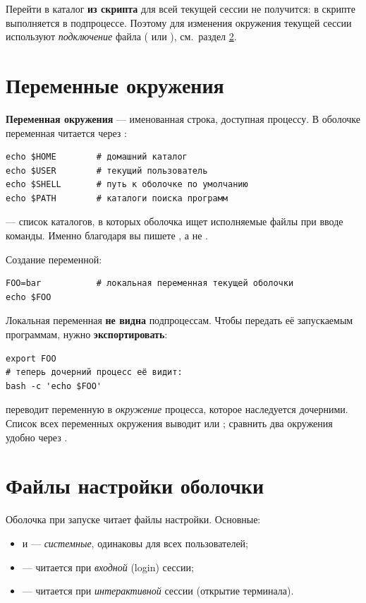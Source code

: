 \begin{tipbox}
Перейти в каталог \textbf{из скрипта} для всей текущей сессии
не получится:  в скрипте выполняется в подпроцессе.
Поэтому для изменения окружения текущей сессии используют
\emph{подключение} файла ( или ),
см.\ раздел \ref{sec:bashrc}.
\end{tipbox}

\section{Переменные окружения}

\textbf{Переменная окружения} --- именованная строка, доступная
процессу. В оболочке переменная читается через :
\begin{verbatim}
echo $HOME        # домашний каталог
echo $USER        # текущий пользователь
echo $SHELL       # путь к оболочке по умолчанию
echo $PATH        # каталоги поиска программ
\end{verbatim}

 --- список каталогов, в которых оболочка ищет исполняемые
файлы при вводе команды. Именно благодаря  вы пишете
, а не .

Создание переменной:
\begin{verbatim}
FOO=bar           # локальная переменная текущей оболочки
echo $FOO
\end{verbatim}

Локальная переменная \textbf{не видна} подпроцессам. Чтобы передать
её запускаемым программам, нужно \textbf{экспортировать}:
\begin{verbatim}
export FOO
# теперь дочерний процесс её видит:
bash -c 'echo $FOO'
\end{verbatim}

 переводит переменную в \emph{окружение} процесса,
которое наследуется дочерними. Список всех переменных окружения
выводит  или ; сравнить два окружения
удобно через .

\section{Файлы настройки оболочки}
\label{sec:bashrc}

Оболочка при запуске читает файлы настройки. Основные:

\begin{itemize}
  \item {} и  ---
    \emph{системные}, одинаковы для всех пользователей;
  \item {} --- читается
    при \emph{входной} (login) сессии;
  \item {} --- читается
    при \emph{интерактивной} сессии (открытие терминала).
\end{itemize}


